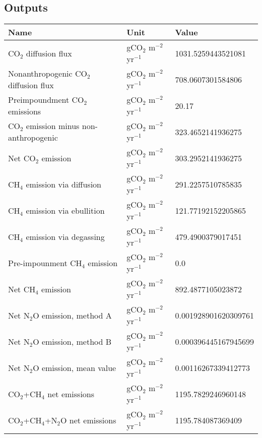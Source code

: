 \documentclass{article}%
\begin{document}
%
\subsection{Outputs}%
\label{subsec:Outputs}%
\begin{center}%
\renewcommand{\arraystretch}{1.0}%
\begin{tabu}{@{}p{10cm} X[c] X[l]@{}}%
\toprule%
\textbf{Name}&\textbf{Unit}&\textbf{Value}\\%
\midrule%
CO$_2$ diffusion flux&gCO$_2$ m$^{-2}$ yr$^{-1}$&\num[round-precision=4,round-mode=figures]{1031.5259443521081}\\%
Nonanthropogenic CO$_2$ diffusion flux&gCO$_2$ m$^{-2}$ yr$^{-1}$&\num[round-precision=4,round-mode=figures]{708.0607301584806}\\%
Preimpoundment CO$_2$ emissions&gCO$_2$ m$^{-2}$ yr$^{-1}$&\num[round-precision=4,round-mode=figures]{20.17}\\%
CO$_2$ emission minus non-anthropogenic&gCO$_2$ m$^{-2}$ yr$^{-1}$&\num[round-precision=4,round-mode=figures]{323.4652141936275}\\%
Net CO$_2$ emission&gCO$_2$ m$^{-2}$ yr$^{-1}$&\num[round-precision=4,round-mode=figures]{303.2952141936275}\\%
CH$_4$ emission via diffusion&gCO$_2$ m$^{-2}$ yr$^{-1}$&\num[round-precision=4,round-mode=figures]{291.2257510785835}\\%
CH$_4$ emission via ebullition&gCO$_2$ m$^{-2}$ yr$^{-1}$&\num[round-precision=4,round-mode=figures]{121.77192152205865}\\%
CH$_4$ emission via degassing&gCO$_2$ m$^{-2}$ yr$^{-1}$&\num[round-precision=4,round-mode=figures]{479.4900379017451}\\%
Pre-impounment CH$_4$ emission&gCO$_2$ m$^{-2}$ yr$^{-1}$&\num[round-precision=4,round-mode=figures]{0.0}\\%
Net CH$_4$ emission&gCO$_2$ m$^{-2}$ yr$^{-1}$&\num[round-precision=4,round-mode=figures]{892.4877105023872}\\%
Net N$_2$O emission, method A&gCO$_2$ m$^{-2}$ yr$^{-1}$&\num[round-precision=4,round-mode=figures]{0.001928901620309761}\\%
Net N$_2$O emission, method B&gCO$_2$ m$^{-2}$ yr$^{-1}$&\num[round-precision=4,round-mode=figures]{0.000396445167945699}\\%
Net N$_2$O emission, mean value&gCO$_2$ m$^{-2}$ yr$^{-1}$&\num[round-precision=4,round-mode=figures]{0.00116267339412773}\\%
\midrule%
CO$_2$+CH$_4$ net emissions&gCO$_2$ m$^{-2}$ yr$^{-1}$&\num[round-precision=4,round-mode=figures]{1195.7829246960148}\\%
\midrule%
CO$_2$+CH$_4$+N$_2$O net emissions&gCO$_2$ m$^{-2}$ yr$^{-1}$&\num[round-precision=4,round-mode=figures]{1195.784087369409}\\\bottomrule%
%
\end{tabu}%
\end{center}%
\end{document}

